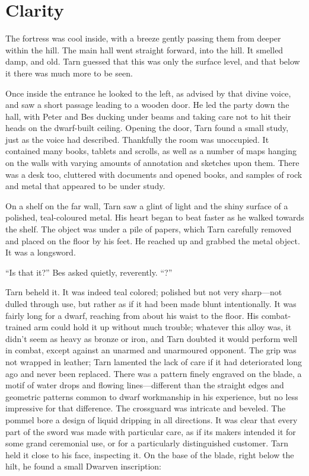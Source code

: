 \chapter{Clarity}

The fortress was cool inside, with a breeze gently passing them from deeper within the hill.  The main hall went straight forward, into the hill.  It smelled damp, and old.  Tarn guessed that this was only the surface level, and that below it there was much more to be seen.

Once inside the entrance he looked to the left, as advised by that divine voice, and saw a short passage leading to a wooden door.  He led the party down the hall, with Peter and Bes ducking under beams and taking care not to hit their heads on the dwarf-built ceiling.  Opening the door, Tarn found a small study, just as the voice had described.  Thankfully the room was unoccupied.  It contained many books, tab\-lets and scrolls, as well as a number of maps hanging on the walls with varying amounts of annotation and sketches upon them.  There was a desk too, cluttered with documents and opened books, and samples of rock and metal that appeared to be under study.

On a shelf on the far wall, Tarn saw a glint of light and the shiny surface of a polished, teal-coloured metal.  His heart began to beat faster as he walked towards the shelf.  The object was under a pile of papers, which Tarn carefully removed and placed on the floor by his feet.  He reached up and grabbed the metal object.  It was a longsword.

``Is that it?'' Bes asked quietly, reverently.  ``\kildir?''

Tarn beheld it.  It was indeed teal colored; polished but not very sharp---not dulled through use, but rather as if it had been made blunt intentionally.  It was fairly long for a dwarf, reaching from about his waist to the floor.  His combat-trained arm could hold it up without much trouble; whatever this alloy was, it didn't seem as heavy as bronze or iron, and Tarn doubted it would perform well in combat, except against an unarmed and unarmoured opponent.  The grip was not wrapped in leather; Tarn lamented the lack of care if it had deteriorated long ago and never been replaced.  There was a pattern finely engraved on the blade, a motif of water drops and flowing lines---different than the straight edges and geometric patterns common to dwarf workmanship in his experience, but no less impressive for that difference.  The crossguard was intricate and beveled.  The pommel bore a design of liquid dripping in all directions.  It was clear that every part of the sword was made with particular care, as if its makers intended it for some grand ceremonial use, or for a particularly distinguished customer.  Tarn held it close to his face, inspecting it.  On the base of the blade, right below the hilt, he found a small Dwarven inscription:

